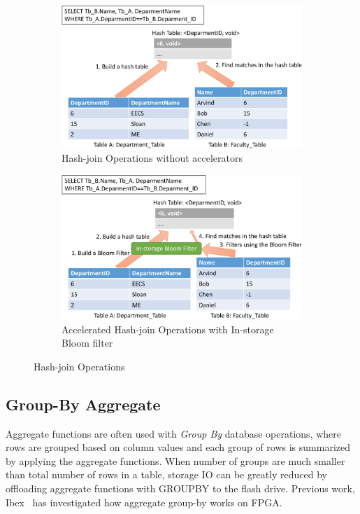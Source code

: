 \documentclass{article}
\newcommand{\groupby}{\textit{Group By}\xspace}
\begin{document}
\begin{figure}[!htb]
  \centering
  \begin{subfigure}[t]{0.48\textwidth}
    \includegraphics[width=\textwidth]{figures/hash-join-crop.pdf}
      \caption{Hash-join Operations without accelerators}
      \label{fig:hash-join}
  \end{subfigure}
  \begin{subfigure}[t]{0.48\textwidth}
    \includegraphics[width=\textwidth]{figures/filter-hash-join-crop.pdf}
    \caption{Accelerated Hash-join Operations with In-storage Bloom filter}
    \label{fig:filter-hash-join}
  \end{subfigure}
  \label{fig:try}
  \caption{Hash-join Operations}
\end{figure}

\subsection{Group-By Aggregate}

Aggregate functions are often used with \groupby database operations, where rows are grouped based on column values and each group of rows is summarized by applying the aggregate functions.
When number of groups are much smaller than total number of rows in a table, storage IO can be greatly reduced by offloading aggregate functions with GROUPBY to the flash drive.
Previous work, Ibex~\cite{ibex} has investigated how aggregate group-by works on FPGA.
\end{document}
